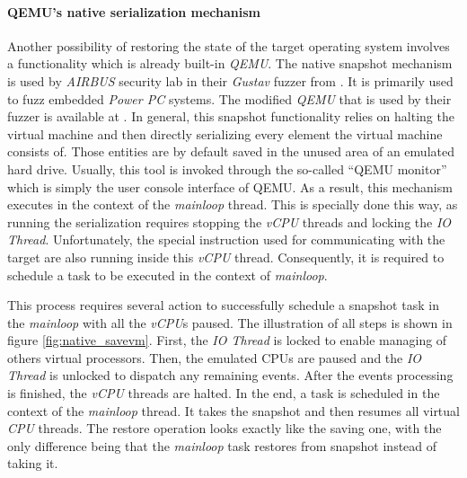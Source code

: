 \paragraph{QEMU's native serialization mechanism} \label{sec:qemu_nat}
Another possibility of restoring the state of the target operating system involves a functionality which is already built-in \textit{QEMU}. The native snapshot mechanism is used by \textit{AIRBUS} security lab in their \textit{Gustav} fuzzer from \cite{gustavdoc}. It is primarily used to fuzz embedded \textit{Power PC} systems. The modified \textit{QEMU} that is used by their fuzzer is available at \cite{airbusqemu}. In general, this snapshot functionality relies on halting the virtual machine and then directly serializing every element the virtual machine consists of. Those entities are by default saved in the unused area of an emulated hard drive. Usually, this tool is invoked through the so-called “QEMU monitor” which is simply the user console interface of QEMU. As a result, this mechanism executes in the context of the \textit{mainloop} thread. This is specially done this way, as running the serialization requires stopping the \textit{vCPU} threads and locking the \textit{IO Thread}. Unfortunately, the special instruction used for communicating with the target are also running inside this \textit{vCPU} thread. Consequently, it is required to schedule a task to be executed in the context of \textit{mainloop}.

This process requires several action to successfully schedule a snapshot task in the \textit{mainloop} with all the \textit{vCPU}s paused. The illustration of all steps is shown in figure \ref{fig:native_savevm}. First, the \textit{IO Thread} is locked to enable managing of others virtual processors. Then, the emulated CPUs are paused and the \textit{IO Thread} is unlocked to dispatch any remaining events. After the events processing is finished, the \textit{vCPU} threads are halted. In the end, a task is scheduled in the context of the \textit{mainloop} thread. It takes the snapshot and then resumes all virtual \textit{CPU} threads. The restore operation looks exactly like the saving one, with the only difference being that the \textit{mainloop} task restores from snapshot instead of taking it.

